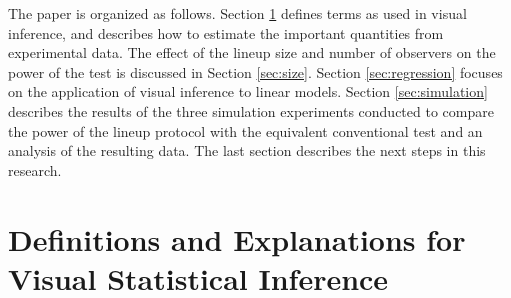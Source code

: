 \documentclass[12pt]{article}
\newcommand{\blue}[1]{{\color{blue} #1}} %
\begin{document}





The paper is organized as follows. Section \ref{sec:visual_test} defines terms as used in visual inference, and describes how to estimate the important quantities from experimental data. The effect of the lineup size and number of observers on the power of the test is discussed in Section \ref{sec:size}. Section \ref{sec:regression} focuses on the application of  visual inference to linear models.  Section \ref{sec:simulation} describes the results of the three simulation experiments conducted to compare the power of the lineup protocol with the equivalent conventional test and an analysis of the resulting data. The last section describes the next steps in this research.


\section{Definitions and Explanations for Visual Statistical Inference} \label{sec:visual_test} 
\end{document}
